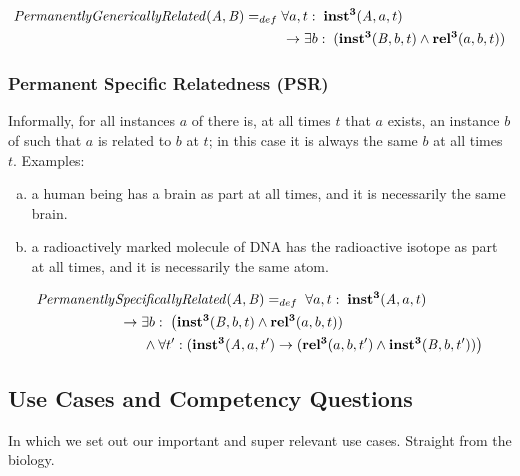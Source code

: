 \begin{equation}
\begin{split}
\mathit{PermanentlyGenericallyRelated}(\mathit{A},\mathit{B}) =_{def}&\;
\forall a, t:\; \mathrm{\mathbf{inst^3}}(\mathit{A}, a, t) \\
&\ \rightarrow
\exists b:\;(\mathrm{\mathbf{inst^3}}(\mathit{B},b,t) \wedge
\mathrm{\mathbf{rel^3}}(a,b,t))
\end{split}
\label{eq:generically:cls}
\end{equation}


\subsubsection{Permanent Specific Relatedness (PSR)}

Informally, for all instances $a$ of  there is, at all times $t$ that $a$ exists, an
instance $b$ of  such that $a$ is related to $b$ at $t$; in this case it is always the
same $b$ at all times $t$. Examples:
\begin{enumerate}[(a)]
\item a human being has a brain as part at all times, and it is necessarily the same brain.
\item a radioactively marked molecule of DNA has the radioactive isotope as part
at all times, and it is necessarily the same atom.
\end{enumerate}

\begin{equation}
\begin{split}
\mathit{Permanently}&\mathit{SpecificallyRelated}(\mathit{A},\mathit{B}) =_{def}\;
\forall a, t:\; \mathrm{\mathbf{inst^3}}(\mathit{A}, a, t) \\
&\ \rightarrow
\exists b:\;\big(\mathrm{\mathbf{inst^3}}(\mathit{B},b,t) \wedge
\mathrm{\mathbf{rel^3}}(a,b,t))
\\
&\quad\quad \wedge \forall t^\prime: (\mathrm{\mathbf{inst^3}}(\mathit{A},a,t^\prime)
\rightarrow (\mathrm{\mathbf{rel^3}}(a,b,t^\prime) \wedge
\mathrm{\mathbf{inst^3}}(\mathit{B},b,t^\prime))\big)
\end{split}
\label{eq:specifically:cls}
\end{equation}


\subsection*{Use Cases and Competency Questions}

In which we set out our important and super relevant use cases. Straight from the biology.


